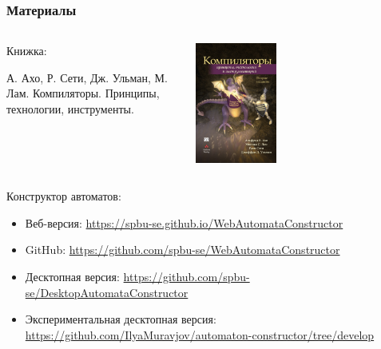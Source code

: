 \documentclass[xetex,mathserif,serif]{beamer}
\begin{document}
    \begin{frame}
        \frametitle{Материалы}
        \begin{columns}
            \begin{column}{0.5\textwidth}
                Книжка:

                А. Ахо, Р. Сети, Дж. Ульман, М. Лам. Компиляторы. Принципы, технологии, инструменты.
            \end{column}
            \begin{column}{0.5\textwidth}
                \begin{center}
                    \includegraphics[width=0.38\textwidth]{compilersCover.png}
                \end{center}
            \end{column}
        \end{columns}

        Конструктор автоматов:
        \begin{itemize}
            \item Веб-версия: \url{https://spbu-se.github.io/WebAutomataConstructor}
            \item GitHub: \url{https://github.com/spbu-se/WebAutomataConstructor}
            \item Десктопная версия: \url{https://github.com/spbu-se/DesktopAutomataConstructor}
            \item Экспериментальная десктопная версия: \url{https://github.com/IlyaMuravjov/automaton-constructor/tree/develop}
        \end{itemize}
    \end{frame}
\end{document}
